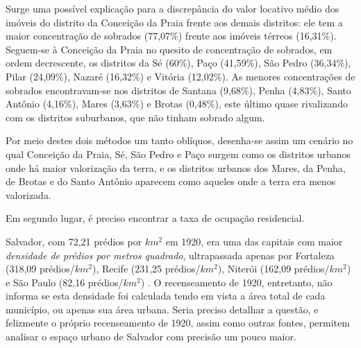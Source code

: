 Surge uma possível explicação para a discrepância do valor locativo médio dos imóveis do distrito da Conceição da Praia frente aos demais distritos: ele tem a maior concentração de sobrados (77,07\%) frente aos imóveis térreos (16,31\%). Seguem-se à Conceição da Praia no quesito de concentração de sobrados, em ordem decrescente, os distritos da Sé (60\%), Paço (41,59\%), São Pedro (36,34\%), Pilar (24,09\%), Nazaré (16,32\%) e Vitória (12,02\%). As menores concentrações de sobrados encontravam-se nos distritos de Santana (9,68\%), Penha (4,83\%), Santo Antônio (4,16\%), Mares (3,63\%) e Brotas (0,48\%), este último quase rivalizando com os distritos suburbanos, que não tinham sobrado algum.

Por meio destes dois métodos um tanto oblíquos, desenha-se assim um cenário no qual Conceição da Praia, Sé, São Pedro e Paço surgem como os distritos urbanos onde há maior valorização da terra, e os distritos urbanos dos Mares, da Penha, de Brotas e do Santo Antônio aparecem como aqueles onde a terra era menos valorizada.

Em segundo lugar, é preciso encontrar a taxa de ocupação residencial.

Salvador, com 72,21 prédios por $km^{2}$ em 1920, era uma das capitais com maior \textit{densidade de prédios por metros quadrado}, ultrapassada apenas por Fortaleza (318,09 prédios/$km^{2}$), Recife (231,25 prédios/$km^{2}$), Niterói (162,09 prédios/$km^{2}$) e São Paulo (82,16 prédios/$km^{2}$) \cite[p.~XV]{brasil_censo46_1920}. O recenseamento de 1920, entretanto, não informa se esta densidade foi calculada tendo em vista a área total de cada município, ou apenas sua área urbana. Seria preciso detalhar a questão, e felizmente o próprio recenseamento de 1920, assim como outras fontes, permitem analisar o espaço urbano de Salvador com precisão um pouco maior.



